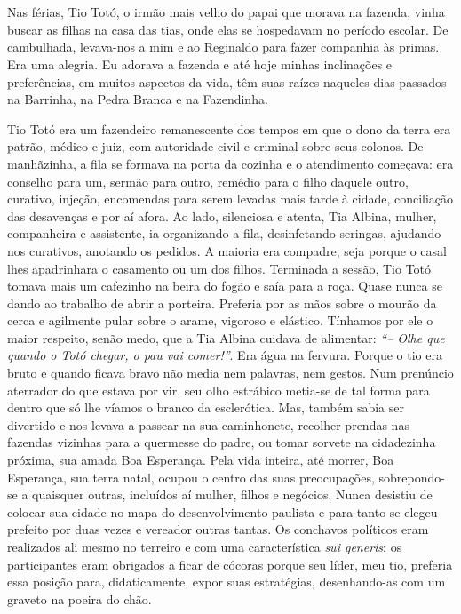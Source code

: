 \chapter{}
Nas férias, Tio Totó, o irmão mais velho do papai que morava na fazenda, vinha buscar as filhas na casa das tias, onde elas se hospedavam no período escolar.
De cambulhada, levava-nos a mim e ao Reginaldo para fazer companhia às primas.
Era uma alegria. 
Eu adorava a fazenda e até hoje minhas inclinações e preferências, em muitos aspectos da vida, têm suas raízes naqueles dias passados na Barrinha, na Pedra Branca e na Fazendinha. 

Tio Totó era um fazendeiro remanescente dos tempos em que o dono da terra era patrão, médico e juiz, com autoridade civil e criminal sobre seus colonos. 
De manhãzinha, a fila se formava na porta da cozinha e o atendimento começava: era conselho para um, sermão para outro, remédio para o filho daquele outro, curativo, injeção, encomendas para serem levadas mais tarde à cidade, conciliação das desavenças e por aí afora. 
Ao lado, silenciosa e atenta, Tia Albina, mulher, companheira e assistente, ia organizando a fila, desinfetando seringas, ajudando nos curativos, anotando os pedidos. 
A maioria era compadre, seja porque o casal lhes apadrinhara o casamento ou um dos filhos. Terminada a sessão, Tio Totó tomava mais um cafezinho na beira do fogão e saía para a roça. 
Quase nunca se dando ao trabalho de abrir a porteira. 
Preferia por as mãos sobre o mourão da cerca e agilmente pular sobre o arame, vigoroso e elástico. 
Tínhamos por ele o maior respeito, senão medo, que a Tia Albina cuidava de alimentar: \textit{``-- Olhe que quando o Totó chegar, o pau vai comer!''}. Era água na fervura.
Porque o tio era bruto e quando ficava bravo não media nem palavras, nem gestos. 
Num prenúncio aterrador do que estava por vir, seu olho estrábico metia-se de tal forma para dentro que só lhe víamos o branco da esclerótica. 
Mas, também sabia ser divertido e nos levava a passear na sua caminhonete, recolher prendas nas fazendas vizinhas para a quermesse do padre, ou tomar sorvete na cidadezinha próxima, sua amada Boa Esperança. 
Pela vida inteira, até morrer, Boa Esperança, sua terra natal, ocupou o centro das suas preocupações, sobrepondo-se a quaisquer outras, incluídos aí mulher, filhos e negócios. 
Nunca desistiu de colocar sua cidade no mapa do desenvolvimento paulista e para tanto se elegeu prefeito por duas vezes e vereador outras tantas. 
Os conchavos políticos eram realizados ali mesmo no terreiro e com uma característica \textit{sui generis}: os participantes eram obrigados a ficar de cócoras porque seu líder, meu tio, preferia essa posição para, didaticamente, expor suas estratégias, desenhando-as com um graveto na poeira do chão.

